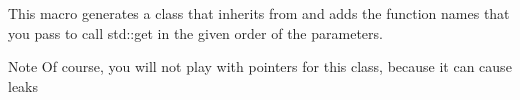 This macro generates a class that inherits from \textquotesingle{} and adds the function names that you pass to call std\+::get in the given order of the parameters. 

\begin{DoxyNote}{Note}
Of course, you will not play with pointers for this class, because it can cause leaks 
\end{DoxyNote}
